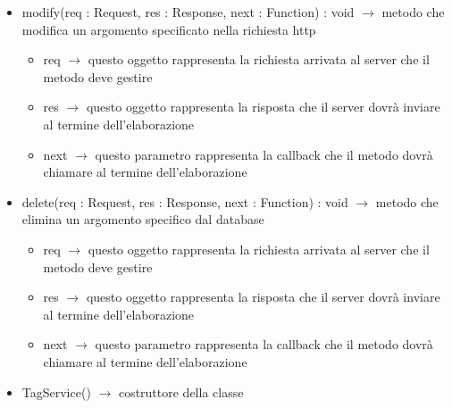 \begin{description}
\begin{itemize}
	\item modify(req : Request, res : Response, next : Function) : void $\rightarrow$ metodo che modifica un argomento specificato nella richiesta http\begin{itemize}
		\item req $\rightarrow$ questo oggetto rappresenta la richiesta arrivata al server che il metodo deve gestire
		\item res $\rightarrow$ questo oggetto rappresenta la risposta che il server dovrà inviare al termine dell'elaborazione
		\item next $\rightarrow$ questo parametro rappresenta la callback che il metodo dovrà chiamare al termine dell'elaborazione
	\end{itemize}
	
	\item delete(req : Request, res : Response, next : Function) : void $\rightarrow$ metodo che elimina un argomento specifico dal database\begin{itemize}
		\item req $\rightarrow$ questo oggetto rappresenta la richiesta arrivata al server che il metodo deve gestire
		\item res $\rightarrow$ questo oggetto rappresenta la risposta che il server dovrà inviare al termine dell'elaborazione
		\item next $\rightarrow$ questo parametro rappresenta la callback che il metodo dovrà chiamare al termine dell'elaborazione
	\end{itemize}
	
	\item TagService() $\rightarrow$ costruttore della classe
\end{itemize}

\end{description}

\vspace{0.5cm}
\hypertarget{server::service::SessionService}{}
